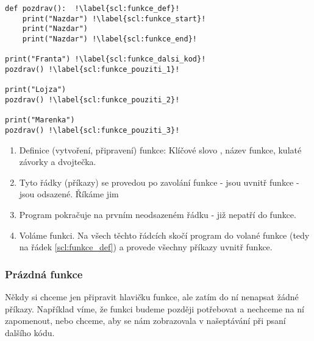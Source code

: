 \begin{minipage}[t]{.45\textwidth}
\begin{code}
\begin{verbatim}
def pozdrav():	!\label{scl:funkce_def}!
	print("Nazdar") !\label{scl:funkce_start}!
	print("Nazdar")
	print("Nazdar") !\label{scl:funkce_end}!
	
print("Franta") !\label{scl:funkce_dalsi_kod}!
pozdrav() !\label{scl:funkce_pouziti_1}!

print("Lojza")
pozdrav() !\label{scl:funkce_pouziti_2}!

print("Marenka")
pozdrav() !\label{scl:funkce_pouziti_3}!
\end{verbatim}

\label{code:funkce_definice}
\end{code}
\end{minipage}
\begin{minipage}[t]{.45\textwidth}
\begin{enumerate}
\item[ř. \ref{scl:funkce_def}:] Definice (vytvoření, připravení) funkce: Klíčové slovo , název funkce, kulaté závorky a dvojtečka.
\item[ř. \ref{scl:funkce_start}-\ref{scl:funkce_end}:] Tyto řádky (příkazy) se provedou po zavolání funkce - jsou uvnitř funkce - jsou odsazené. Říkáme jim 
\item[ř. \ref{scl:funkce_dalsi_kod}:] Program pokračuje na prvním neodsazeném řádku - již nepatří do funkce.
\item[ř. \ref{scl:funkce_pouziti_1}, \ref{scl:funkce_pouziti_2}, \ref{scl:funkce_pouziti_3}:] Voláme funkci. Na všech těchto řádcích skočí program do volané funkce (tedy na řádek \ref{scl:funkce_def}) a provede všechny příkazy uvnitř funkce.
\end{enumerate}
\end{minipage}

\subsubsection{Prázdná funkce}
Někdy si chceme jen připravit hlavičku funkce, ale zatím do ní nenapsat žádné příkazy. Například víme, že funkci budeme později potřebovat a nechceme na ní zapomenout, nebo chceme, aby se nám zobrazovala v našeptávání při psaní dalšího kódu.\\

